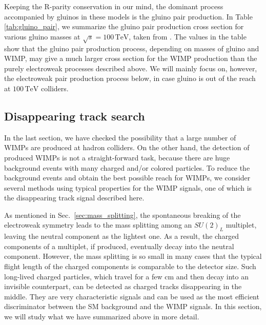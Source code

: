 \documentclass[12pt,twoside,book]{article}
\begin{document}
Keeping the R-parity conservation in our mind, the dominant process accompanied by gluinos in these models is the gluino pair production.
In Table \ref{tab:gluino_pair}, we summarize the gluino pair production cross section for various gluino masses at $\sqrt{s} = 100\,\mathrm{TeV}$, taken from \cite{Asai:2019wst}.
The values in the table show that the gluino pair production process, depending on masses of gluino and WIMP, may give a much larger cross section for the WIMP production than the purely electroweak processes described above.
We will mainly focus on, however, the electroweak pair production process below, in case gluino is out of the reach at $100\,\mathrm{TeV}$ colliders.


\subsection{Disappearing track search}
\label{sec:disappearing_track}

In the last section, we have checked the possibility that a large number of WIMPs are produced at hadron colliders.
On the other hand, the detection of produced WIMPs is not a straight-forward task, because there are huge background events with many charged and/or colored particles.
To reduce the background events and obtain the best possible reach for WIMPs, we consider several methods using typical properties for the WIMP signals, one of which is the disappearing track signal described here.

As mentioned in Sec.~\ref{sec:mass_splitting}, the spontaneous breaking of the electroweak symmetry leads to the mass splitting among an $SU(2)_L$ multiplet, leaving the neutral component as the lightest one.
As a result, the charged components of a multiplet, if produced, eventually decay into the neutral component.
However, the mass splitting is so small in many cases that the typical flight length of the charged components is comparable to the detector size.
Such long-lived charged particles, which travel for a few $\mathrm{cm}$ and then decay into an invisible counterpart, can be detected as charged tracks disappearing in the middle.
They are very characteristic signals and can be used as the most efficient discriminator between the SM background and the WIMP signals.
In this section, we will study what we have summarized above in more detail.
\end{document}
